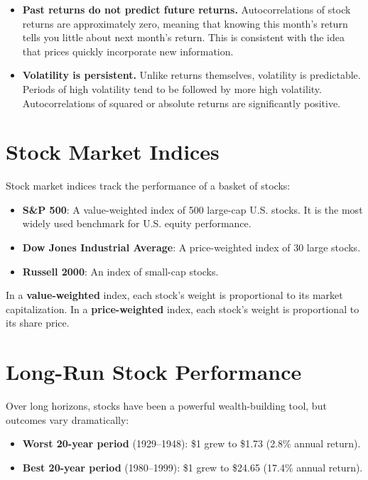 \documentclass[11pt,letterpaper]{report}
\begin{document}
\begin{itemize}
  \item \textbf{Past returns do not predict future returns.}  Autocorrelations of stock returns are approximately zero, meaning that knowing this month's return tells you little about next month's return.  This is consistent with the idea that prices quickly incorporate new information.
\end{itemize}

\begin{itemize}
  \item \textbf{Volatility is persistent.}  Unlike returns themselves, volatility is predictable.  Periods of high volatility tend to be followed by more high volatility.  Autocorrelations of squared or absolute returns are significantly positive.
\end{itemize}

\section{Stock Market Indices}


Stock market indices track the performance of a basket of stocks:

\begin{itemize}
  \item \textbf{S&P 500}: A value-weighted index of 500 large-cap U.S. stocks.  It is the most widely used benchmark for U.S. equity performance.
  \item \textbf{Dow Jones Industrial Average}: A price-weighted index of 30 large stocks.
  \item \textbf{Russell 2000}: An index of small-cap stocks.
\end{itemize}

In a \textbf{value-weighted} index, each stock's weight is proportional to its market capitalization.  In a \textbf{price-weighted} index, each stock's weight is proportional to its share price.

\section{Long-Run Stock Performance}


Over long horizons, stocks have been a powerful wealth-building tool, but outcomes vary dramatically:

\begin{itemize}
  \item \textbf{Worst 20-year period} (1929--1948): \$1 grew to \$1.73 (2.8\% annual return).
  \item \textbf{Best 20-year period} (1980--1999): \$1 grew to \$24.65 (17.4\% annual return).
\end{itemize}
\end{document}
